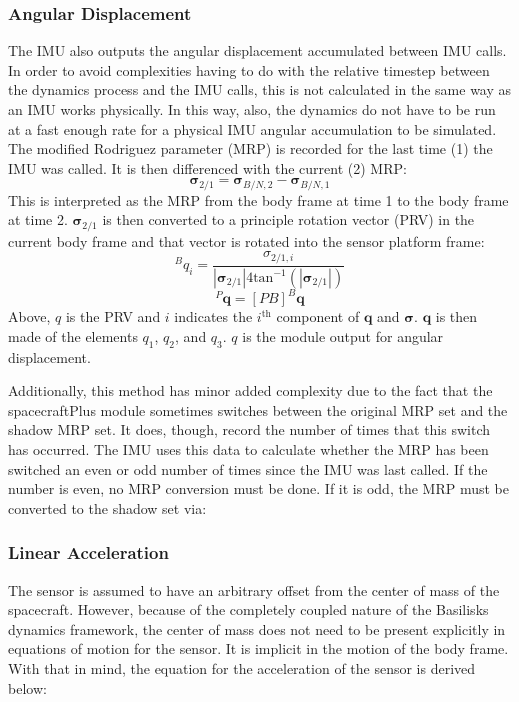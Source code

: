 \subsubsection{Angular Displacement}
The IMU also outputs the angular displacement accumulated between IMU calls. In order to avoid complexities having to do with the relative timestep between the dynamics process and the IMU calls, this is not calculated in the same way as an IMU works physically. In this way, also, the dynamics do not have to be run at a fast enough rate for a physical IMU angular accumulation to be simulated. 
The modified Rodriguez parameter (MRP) is recorded for the last time (1) the IMU was called. It is then differenced with the current (2) MRP:
\begin{equation}
	\bm{\sigma}_{2/1} = \bm{\sigma}_{B/N,2} - \bm{\sigma}_{B/N,1}
\end{equation}
This is interpreted as the MRP from the body frame at time 1 to the body frame at time 2. $\bm{\sigma}_{2/1}$ is then converted to a principle rotation vector (PRV) in the current body frame and that vector is rotated into the sensor platform frame:
\begin{equation}
		^Bq_{i} = \frac{\sigma_{2/1,i}}{|\bm{\sigma}_{2/1}| 4 \mathrm{tan}^{-1}(|\bm{\sigma}_{2/1}|)}
\end{equation}
\begin{equation}
	^P\bm{q} = [PB] ^B\bm{q}
\end{equation}
Above, $q$ is the PRV and $i$ indicates the $i^{\mathrm{th}}$ component of $\bm{q}$ and $\bm{\sigma}$. $\bm{q}$ is then made of the elements $q_1$, $q_2$, and $q_3$. $q$ is the module output for angular displacement.

Additionally, this method has minor added complexity due to the fact that the spacecraftPlus module sometimes switches between the original MRP set and the shadow MRP set. It does, though, record the number of times that this switch has occurred. The IMU uses this data to calculate whether the MRP has been switched an even or odd number of times since the IMU was last called. If the number is even, no MRP conversion must be done. If it is odd, the MRP must be converted to the shadow set via:


\subsubsection{Linear Acceleration}
The sensor is assumed to have an arbitrary offset from the center of mass of the spacecraft. However, because of the completely coupled nature of the Basilisks dynamics framework, the center of mass does not need to be present explicitly in equations of motion for the sensor. It is implicit in the motion of the body frame. With that in mind, the equation for the acceleration of the sensor is derived below:

